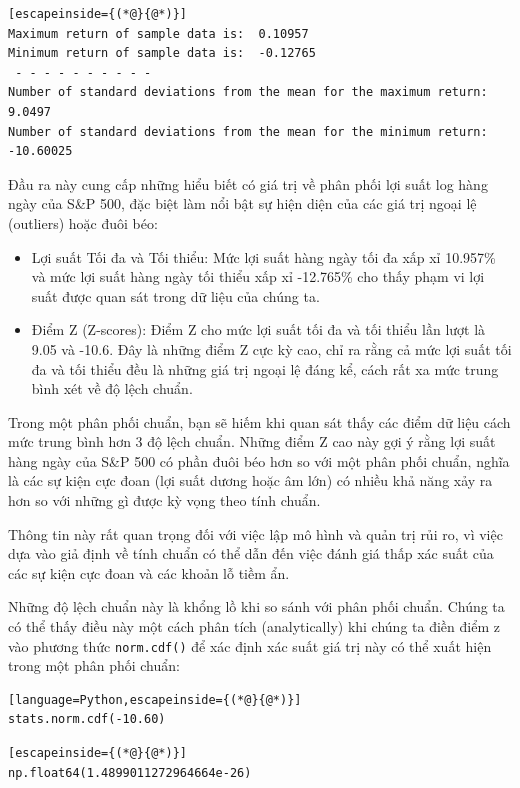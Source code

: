 \begin{lstlisting}[escapeinside={(*@}{@*)}]
Maximum return of sample data is:  0.10957
Minimum return of sample data is:  -0.12765
 - - - - - - - - - -
Number of standard deviations from the mean for the maximum return:  9.0497
Number of standard deviations from the mean for the minimum return:  -10.60025
\end{lstlisting}

Đầu ra này cung cấp những hiểu biết có giá trị về phân phối lợi suất log hàng ngày của S\&P 500, đặc biệt làm nổi bật sự hiện diện của các giá trị ngoại lệ (outliers) hoặc đuôi béo:

\begin{itemize}
  \item Lợi suất Tối đa và Tối thiểu: Mức lợi suất hàng ngày tối đa xấp xỉ 10.957\% và mức lợi suất hàng ngày tối thiểu xấp xỉ -12.765\% cho thấy phạm vi lợi suất được quan sát trong dữ liệu của chúng ta.
  \item Điểm Z (Z-scores): Điểm Z cho mức lợi suất tối đa và tối thiểu lần lượt là 9.05 và -10.6. Đây là những điểm Z cực kỳ cao, chỉ ra rằng cả mức lợi suất tối đa và tối thiểu đều là những giá trị ngoại lệ đáng kể, cách rất xa mức trung bình xét về độ lệch chuẩn.
\end{itemize}
Trong một phân phối chuẩn, bạn sẽ hiếm khi quan sát thấy các điểm dữ liệu cách mức trung bình hơn 3 độ lệch chuẩn. Những điểm Z cao này gợi ý rằng lợi suất hàng ngày của S\&P 500 có phần đuôi béo hơn so với một phân phối chuẩn, nghĩa là các sự kiện cực đoan (lợi suất dương hoặc âm lớn) có nhiều khả năng xảy ra hơn so với những gì được kỳ vọng theo tính chuẩn.

Thông tin này rất quan trọng đối với việc lập mô hình và quản trị rủi ro, vì việc dựa vào giả định về tính chuẩn có thể dẫn đến việc đánh giá thấp xác suất của các sự kiện cực đoan và các khoản lỗ tiềm ẩn.

Những độ lệch chuẩn này là khổng lồ khi so sánh với phân phối chuẩn. Chúng ta có thể thấy điều này một cách phân tích (analytically) khi chúng ta điền điểm z vào phương thức \texttt{norm.cdf()} để xác định xác suất giá trị này có thể xuất hiện trong một phân phối chuẩn:

\begin{lstlisting}[language=Python,escapeinside={(*@}{@*)}]
stats.norm.cdf(-10.60)
\end{lstlisting}

\begin{lstlisting}[escapeinside={(*@}{@*)}]
np.float64(1.4899011272964664e-26)
\end{lstlisting}

